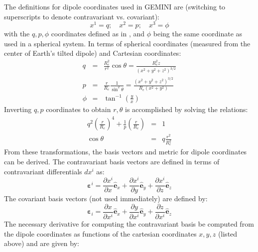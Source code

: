 \documentclass[11pt,letterpaper]{article}
\begin{document}
The definitions for dipole coordinates used in GEMINI are (switching to superscripts to denote contravariant vs. covariant):  
\begin{equation}
x^1 = q; \quad x^2 = p; \quad x^3 = \phi
\end{equation}
with the $q,p,\phi$ coordinates defined as in \citet{Huba:2000}, and $\phi$ being the same coordinate as used in a spherical system.  In terms of spherical coordinates (measured from the center of Earth's tilted dipole) and Cartesian coordinates:  
\begin{eqnarray}
q &=& \frac{R_e^2}{r^2} \cos \theta = \frac{R_e^2 z}{\left( x^2+y^2+z^2\right)^{3/2}}\\
p &=& \frac{r}{R_e} \frac{1}{\sin^2 \theta} = \frac{\left( x^2+y^2+z^2\right)^{3/2}}{R_e \left( x^2 + y^2 \right) } \\
\phi &=& \tan^{-1} \left( \frac{y}{x} \right)
\end{eqnarray}
Inverting $q,p$ coordinates to obtain $r,\theta$ is accomplished by solving the relations:
\begin{eqnarray}
q^2 \left( \frac{r}{R_e}\right)^4 + \frac{1}{p} \left( \frac{r}{R_e}\right)  &=& 1 \\
\cos \theta &=& q \frac{r^2}{R_e^2}
\end{eqnarray}
From these transformations, the basis vectors and metric for dipole coordinates can be derived.  The contravariant basis vectors are defined in terms of contravariant differentials $d x^i$ as:
\begin{equation}
\boldsymbol{\varepsilon}^i = \frac{\partial x^i}{\partial x} \hat{\mathbf{e}}_x + \frac{\partial x^i}{\partial y} \hat{\mathbf{e}}_y + \frac{\partial x^i}{\partial z} \hat{\mathbf{e}}_z \label{eqn:conbasis}
\end{equation}
The covariant basis vectors (not used immediately) are defined by:
\begin{equation}
\boldsymbol{\varepsilon}_i = \frac{\partial x}{\partial x^i} \hat{\mathbf{e}}_x + \frac{\partial y}{\partial x^i} \hat{\mathbf{e}}_y + \frac{\partial z}{\partial x^i} \hat{\mathbf{e}}_z \label{eqn:conbasis}
\end{equation}
The necessary derivative for computing the contravariant basis be computed from the dipole coordinates as functions of the cartesian coordinates $x,y,z$ (listed above) and are given by:  
\end{document}
